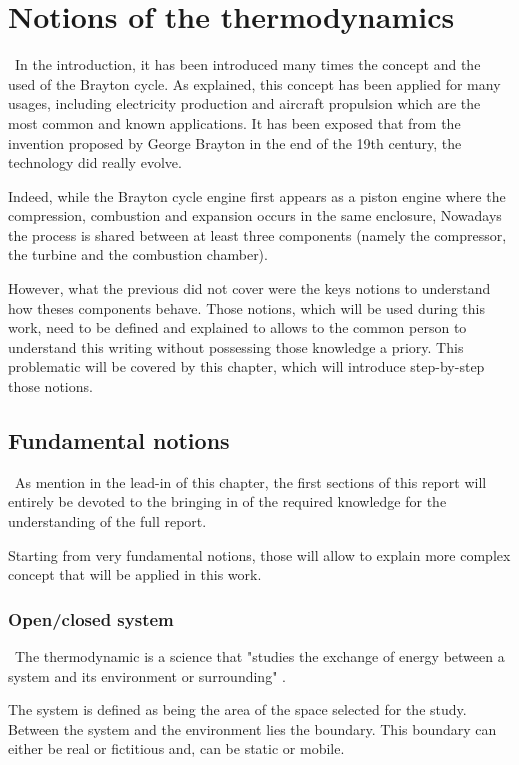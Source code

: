 \graphicspath{{Chapter_2_-_Notions_of_thermodynamics/Images/}}
\chapter{Notions of the thermodynamics}
\quad\, In the introduction, it has been introduced many times the concept and the used of the Brayton cycle. As explained, this concept has been applied for many usages, including electricity production and aircraft propulsion which are the most common and known applications. It has been exposed that from the invention proposed by George Brayton in the end of the 19th century, the technology did really evolve.

Indeed, while the Brayton cycle engine first appears as a  piston engine where the compression, combustion and expansion occurs in the same enclosure, Nowadays 
the process is shared between at least three components (namely the compressor, the turbine and the combustion chamber).

However, what the previous did not cover were the keys notions to understand how theses components behave. Those notions, which will be used during this work, need to be defined and explained to allows to the common person to understand this writing without possessing those knowledge a priory. 
This problematic will be covered by this chapter, which will introduce step-by-step those notions.

\section{Fundamental notions}
\quad\, As mention in the lead-in of this chapter, the first sections of this report will entirely be devoted to the bringing in of the required knowledge for the understanding of the full report.

Starting from very fundamental notions, those will allow to explain more complex concept that will be applied in this work.
\newpage
\subsection{Open/closed system}\label{sect:C2_Sys}
\quad\,  The thermodynamic is a science that "studies the exchange of energy between a system and its environment or surrounding" \cite{thermoApp_1}.

The system is defined as being the area of the space selected for the study. Between the system and the environment lies the boundary. This boundary can either be real or fictitious and, can be static or mobile.

